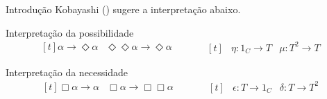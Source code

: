 \documentclass[table]{beamer}
\def\\{}%
\begin{document}
    \begin{frame}{Introdução}
        \justifying{}
        Kobayashi (\citeyear{Kobayashi}) sugere a interpretação abaixo.
        \begin{block}{Interpretação da possibilidade}
            \begin{equation*}
            \begin{aligned}[t]
                \alpha\to\Diamond\alpha& \\
                \Diamond\Diamond\alpha\to\Diamond\alpha&
            \end{aligned}
            \qquad
            \begin{aligned}[t]
                &\eta\mathrel{\colon}1_{C}\to T\\
                &\mu\mathrel{\colon}T^2\to T
            \end{aligned}
            \end{equation*}
        \end{block}

        \begin{block}{Interpretação da necessidade}
            \begin{equation*}
            \begin{aligned}[t]
                \Box\alpha\to\alpha& \\
                \Box\alpha\to\Box\Box\alpha&
            \end{aligned}
            \qquad
            \begin{aligned}[t]
                &\epsilon\mathrel{\colon}T\to 1_{C}\\
                &\delta\mathrel{\colon}T\to T^2
            \end{aligned}
            \end{equation*}
        \end{block}
    \end{frame}
\end{document}
